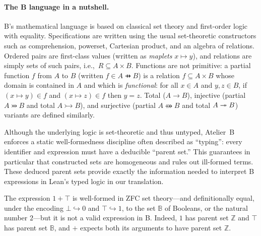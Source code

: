 \paragraph*{The B language in a nutshell.}
B's mathematical language is based on classical set theory and first-order logic with equality.
Specifications are written using the usual set-theoretic constructors such as comprehension, powerset, Cartesian product, and an algebra of relations.
Ordered pairs are first-class values (written as \emph{maplets} $x \mapsto y$), and relations are simply sets of such pairs, i.e.,\ $R \subseteq A \times B$.
Functions are not primitive: a partial function $f$ from $A$ to $B$ (written $f \in A \pfun B$) is a relation $f \subseteq A \times B$ whose domain is contained in $A$ and which is \emph{functional}:
for all $x \in A$ and $y,z \in B$, if $(x \mapsto y) \in f$ and $(x \mapsto z) \in f$ then $y = z$.
Total ($A \longrightarrow B$), injective (partial $A \pinj B$ and total $A \tinj B$), and surjective (partial $A \psurj B$ and total $A \twoheadrightarrow B$) variants are defined similarly.

Although the underlying logic is set-theoretic and thus untyped, Atelier~B enforces a static well-formedness discipline often described as ``typing'': every identifier and expression must have a deducible ``parent set.''
This guarantees in particular that constructed sets are homogeneous and rules out ill-formed terms.
These deduced parent sets provide exactly the information needed to interpret B expressions in Lean's typed logic in our translation.

\begin{example}
	The expression $1 + \top$ is well-formed in ZFC set theory---and definitionally equal, under the encoding \(\bot \hookrightarrow 0\) and \(\top \hookrightarrow 1\), to the set $\mathbb{B}$ of Booleans, or the natural number $2$---but it is not a valid expression in B.
	Indeed, $1$ has parent set $\mathbb{Z}$ and $\top$ has parent set $\mathbb{B}$, and $+$ expects both its arguments to have parent set $\mathbb{Z}$.

\end{example}

